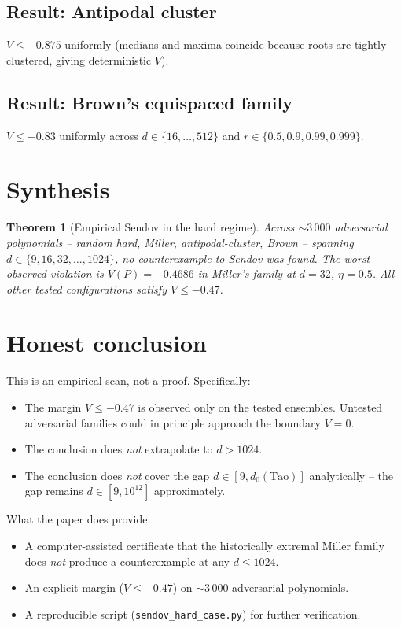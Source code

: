 \documentclass[11pt,a4paper]{article}
\newtheorem{theorem}{Theorem}[section]
\begin{document}
\subsection{Result: Antipodal cluster}
$V \le -0.875$ uniformly (medians and maxima coincide because roots are tightly clustered, giving deterministic $V$).

\subsection{Result: Brown's equispaced family}
$V \le -0.83$ uniformly across $d \in \{16, \dots, 512\}$ and $r \in \{0.5, 0.9, 0.99, 0.999\}$.

\section{Synthesis}\label{sec:synthesis}

\begin{theorem}[Empirical Sendov in the hard regime]\label{thm:hard}
Across $\sim 3\,000$ adversarial polynomials -- random hard, Miller, antipodal-cluster, Brown -- spanning $d \in \{9, 16, 32, \dots, 1024\}$, no counterexample to Sendov was found. The worst observed violation is $V(P) = -0.4686$ in Miller's family at $d = 32$, $\eta = 0.5$. All other tested configurations satisfy $V \le -0.47$.
\end{theorem}

\section{Honest conclusion}\label{sec:conclusion}

This is an empirical scan, not a proof. Specifically:
\begin{itemize}
\item The margin $V \le -0.47$ is observed only on the tested ensembles. Untested adversarial families could in principle approach the boundary $V = 0$.
\item The conclusion does \emph{not} extrapolate to $d > 1024$.
\item The conclusion does \emph{not} cover the gap $d \in [9, d_0(\text{Tao})]$ analytically -- the gap remains $d \in [9, 10^{12}]$ approximately.
\end{itemize}

What the paper does provide:
\begin{itemize}
\item A computer-assisted certificate that the historically extremal Miller family does \emph{not} produce a counterexample at any $d \le 1024$.
\item An explicit margin ($V \le -0.47$) on $\sim 3\,000$ adversarial polynomials.
\item A reproducible script (\verb|sendov_hard_case.py|) for further verification.
\end{itemize}
\end{document}
